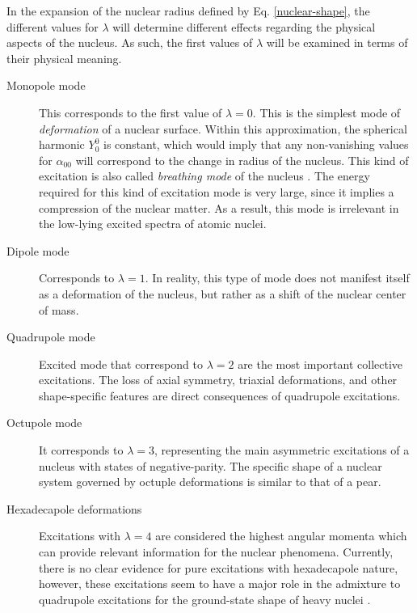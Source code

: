 In the expansion of the nuclear radius defined by Eq. 
\ref{nuclear-shape}, the different values for $\lambda$ will determine different effects regarding the physical aspects of the nucleus. As such, the first values of $\lambda$ will be examined in terms of their physical meaning.
\begin{description}
    \item[Monopole mode] This corresponds to the first value of $\lambda=0$. This is the simplest mode of \emph{deformation} of a nuclear surface. Within this approximation, the spherical harmonic $Y_0^0$ is constant, which would imply that any non-vanishing values for $\alpha_{00}$ will correspond to the change in radius of the nucleus. This kind of excitation is also called \emph{breathing mode} of the nucleus \cite{greiner1996nuclear,bohr1998nuclear}. The energy required for this kind of excitation mode is very large, since it implies a compression of the nuclear matter. As a result, this mode is irrelevant in the low-lying excited spectra of atomic nuclei.
    \item[Dipole mode] Corresponds to $\lambda=1$. In reality, this type of mode does not manifest itself as a deformation of the nucleus, but rather as a shift of the nuclear center of mass.
    \item[Quadrupole mode] Excited mode that correspond to $\lambda=2$ are the most important collective excitations. The loss of axial symmetry, triaxial deformations, and other shape-specific features are direct consequences of quadrupole excitations.
    \item[Octupole mode] It corresponds to $\lambda=3$, representing the main asymmetric excitations of a nucleus with states of negative-parity. The specific shape of a nuclear system governed by octuple deformations is similar to that of a pear.
    \item[Hexadecapole deformations] Excitations with $\lambda=4$ are considered the highest angular momenta which can provide relevant information for the nuclear phenomena. Currently, there is no clear evidence for pure excitations with hexadecapole nature, however, these excitations seem to have a major role in the admixture to quadrupole excitations for the ground-state shape of heavy nuclei \cite{greiner1996nuclear}.
\end{description}

